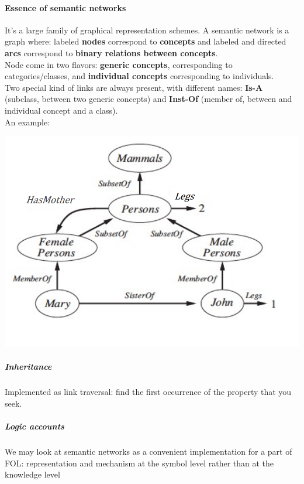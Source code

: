\documentclass[10pt]{report}
\begin{document}
\paragraph{Essence of semantic networks} It's a large family of graphical representation schemes. A semantic network is a graph where: labeled \textbf{nodes} correspond to \textbf{concepts} and labeled and directed \textbf{arcs} correspond to \textbf{binary relations between concepts}.\\
Node come in two flavors: \textbf{generic concepts}, corresponding to categories/classes, and \textbf{individual concepts} corresponding to individuals.\\
Two special kind of links are always present, with different names: \textbf{Is-A} (subclass, between two generic concepts) and \textbf{Inst-Of} (member of, between and individual concept and a class).\\
An example:
\begin{center}
	\includegraphics[scale=0.5]{17.png}
\end{center}
\subparagraph{Inheritance} Implemented as link traversal: find the first occurrence of the property that you seek.
\subparagraph{Logic accounts} We may look at semantic networks as a convenient implementation for a part of FOL: representation and mechanism at the symbol level rather than at the knowledge level
\end{document}
